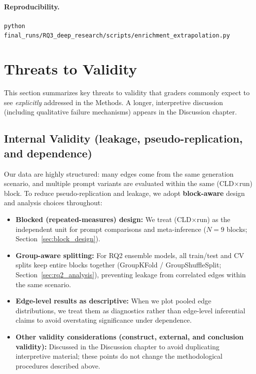 \paragraph{Reproducibility.}
\texttt{python final\_runs/RQ3\_deep\_research/scripts/enrichment\_extrapolation.py}

\endgroup

\section{Threats to Validity}
\label{sec:threats_to_validity}

This section summarizes key threats to validity that graders commonly expect to see \emph{explicitly} addressed in the Methods. A longer, interpretive discussion (including qualitative failure mechanisms) appears in the Discussion chapter.

\subsection{Internal Validity (leakage, pseudo-replication, and dependence)}
Our data are highly structured: many edges come from the same generation scenario, and multiple prompt variants are evaluated within the same (CLD$\times$run) block. To reduce pseudo-replication and leakage, we adopt \textbf{block-aware} design and analysis choices throughout:
\begin{itemize}[noitemsep]
    \item \textbf{Blocked (repeated-measures) design:} We treat (CLD$\times$run) as the independent unit for prompt comparisons and meta-inference ($N=9$ blocks; Section~\ref{sec:block_design}).
    \item \textbf{Group-aware splitting:} For RQ2 ensemble models, all train/test and CV splits keep entire blocks together (GroupKFold / GroupShuffleSplit; Section~\ref{sec:rq2_analysis}), preventing leakage from correlated edges within the same scenario.
    \item \textbf{Edge-level results as descriptive:} When we plot pooled edge distributions, we treat them as diagnostics rather than edge-level inferential claims to avoid overstating significance under dependence.
\end{itemize}

\begin{itemize}[noitemsep]
    \item \textbf{Other validity considerations (construct, external, and conclusion validity):} Discussed in the Discussion chapter to avoid duplicating interpretive material; these points do not change the methodological procedures described above.
\end{itemize}

